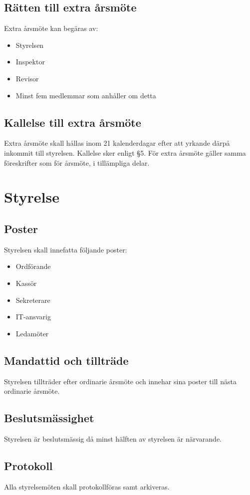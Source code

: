\documentclass[11pt,a4paper]{article}
\begin{document}
\subsection{Rätten till extra årsmöte}
Extra årsmöte kan begäras av:
\begin{itemize}
\item Styrelsen
\item Inspektor
\item Revisor
\item Minst fem medlemmar som anhåller om detta
\end{itemize}
\subsection{Kallelse till extra årsmöte}
Extra årsmöte skall hållas inom 21 kalenderdagar efter att yrkande därpå inkommit till styrelsen. Kallelse sker enligt §5. För extra årsmöte gäller samma föreskrifter som för årsmöte, i tillämpliga delar.



\section{Styrelse}

\subsection{Poster}
Styrelsen skall innefatta följande poster:
\begin{itemize}
\item Ordförande
\item Kassör
\item Sekreterare
\item IT-ansvarig
\item Ledamöter
\end{itemize}
\subsection{Mandattid och tillträde}
Styrelsen tillträder efter ordinarie årsmöte och innehar sina poster till nästa ordinarie årsmöte.
\subsection{Beslutsmässighet}
Styrelsen är beslutsmässig då minst hälften av styrelsen är närvarande.
\subsection{Protokoll}
Alla styrelsemöten skall protokollföras samt arkiveras. 
\end{document}
